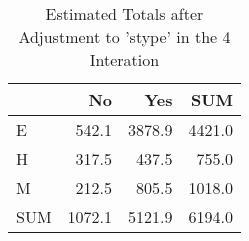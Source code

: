 \begin{table}[ht]
\centering
\caption{Estimated Totals after Adjustment to 'stype' in the 4 Interation} 
\begin{tabular}{l|rr|r}
  & No & Yes & SUM \\ 
  \hline
E & 542.1 & 3878.9 & 4421.0 \\ 
  H & 317.5 & 437.5 & 755.0 \\ 
  M & 212.5 & 805.5 & 1018.0 \\ 
   \hline
SUM & 1072.1 & 5121.9 & 6194.0 \\ 
  \end{tabular}
\end{table}
